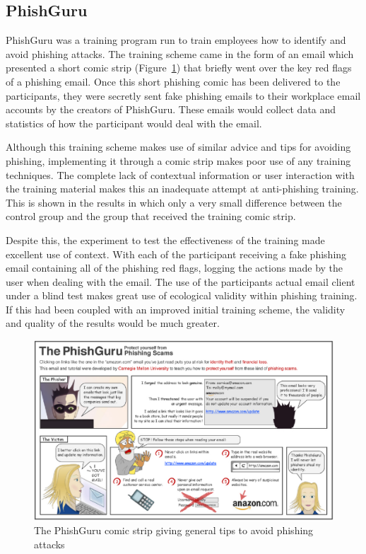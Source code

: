 \documentclass{l4proj}
\begin{document}
\subsection{PhishGuru}
PhishGuru \citep{kumaraguru2008lessons} was a training program run to train employees how to identify and avoid phishing attacks. The training scheme came in the form of an email which presented a short comic strip (Figure~\ref{fig:phishguru}) that briefly went over the key red flags of a phishing email. Once this short phishing comic has been delivered to the participants, they were secretly sent fake phishing emails to their workplace email accounts by the creators of PhishGuru. These emails would collect data and statistics of how the participant would deal with the email. 

Although this training scheme makes use of similar advice and tips for avoiding phishing, implementing it through a comic strip makes poor use of any training techniques. The complete lack of contextual information or user interaction with the training material makes this an inadequate attempt at anti-phishing training. This is shown in the results in which only a very small difference between the control group and the group that received the training comic strip.

Despite this, the experiment to test the effectiveness of the training made excellent use of context. With each of the participant receiving a fake phishing email containing all of the phishing red flags, logging the actions made by the user when dealing with the email. The use of the participants actual email client under a blind test makes great use of ecological validity within phishing training. If this had been coupled with an improved initial training scheme, the validity and quality of the results would be much greater.

\begin{figure}[H]
    \centering
    \includegraphics[width=1\linewidth]{images/phishguru.png}    
    \caption{The PhishGuru comic strip giving general tips to avoid phishing attacks }
    \label{fig:phishguru} 
\end{figure}
\end{document}
